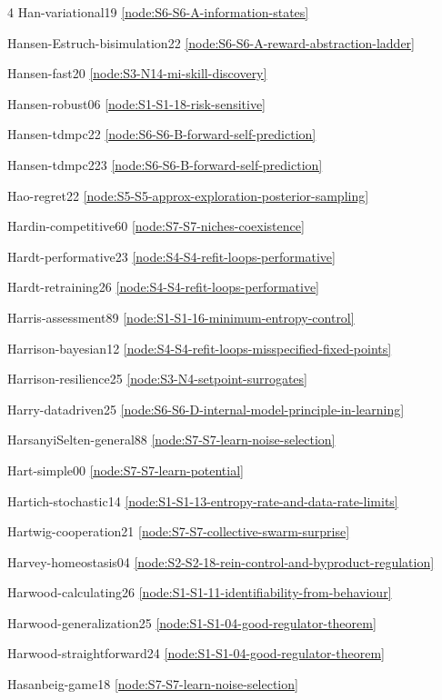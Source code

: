 \documentclass[10pt]{article}
\begin{document}
{\begin{multicols}{4}
Han-variational19 \hfill \ref{node:S6-S6-A-information-states}\par
Hansen-Estruch-bisimulation22 \hfill \ref{node:S6-S6-A-reward-abstraction-ladder}\par
Hansen-fast20 \hfill \ref{node:S3-N14-mi-skill-discovery}\par
Hansen-robust06 \hfill \ref{node:S1-S1-18-risk-sensitive}\par
Hansen-tdmpc22 \hfill \ref{node:S6-S6-B-forward-self-prediction}\par
Hansen-tdmpc223 \hfill \ref{node:S6-S6-B-forward-self-prediction}\par
Hao-regret22 \hfill \ref{node:S5-S5-approx-exploration-posterior-sampling}\par
Hardin-competitive60 \hfill \ref{node:S7-S7-niches-coexistence}\par
Hardt-performative23 \hfill \ref{node:S4-S4-refit-loops-performative}\par
Hardt-retraining26 \hfill \ref{node:S4-S4-refit-loops-performative}\par
Harris-assessment89 \hfill \ref{node:S1-S1-16-minimum-entropy-control}\par
Harrison-bayesian12 \hfill \ref{node:S4-S4-refit-loops-misspecified-fixed-points}\par
Harrison-resilience25 \hfill \ref{node:S3-N4-setpoint-surrogates}\par
Harry-datadriven25 \hfill \ref{node:S6-S6-D-internal-model-principle-in-learning}\par
HarsanyiSelten-general88 \hfill \ref{node:S7-S7-learn-noise-selection}\par
Hart-simple00 \hfill \ref{node:S7-S7-learn-potential}\par
Hartich-stochastic14 \hfill \ref{node:S1-S1-13-entropy-rate-and-data-rate-limits}\par
Hartwig-cooperation21 \hfill \ref{node:S7-S7-collective-swarm-surprise}\par
Harvey-homeostasis04 \hfill \ref{node:S2-S2-18-rein-control-and-byproduct-regulation}\par
Harwood-calculating26 \hfill \ref{node:S1-S1-11-identifiability-from-behaviour}\par
Harwood-generalization25 \hfill \ref{node:S1-S1-04-good-regulator-theorem}\par
Harwood-straightforward24 \hfill \ref{node:S1-S1-04-good-regulator-theorem}\par
Hasanbeig-game18 \hfill \ref{node:S7-S7-learn-noise-selection}\par

\end{multicols}}
\end{document}
